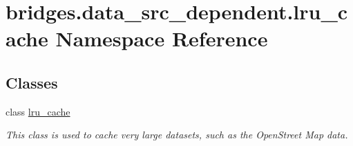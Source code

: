\hypertarget{namespacebridges_1_1data__src__dependent_1_1lru__cache}{}\section{bridges.\+data\+\_\+src\+\_\+dependent.\+lru\+\_\+cache Namespace Reference}
\label{namespacebridges_1_1data__src__dependent_1_1lru__cache}
\subsection*{Classes}
\begin{DoxyCompactItemize}
\item 
class \hyperlink{classbridges_1_1data__src__dependent_1_1lru__cache_1_1lru__cache}{lru\+\_\+cache}
\begin{DoxyCompactList}\small\item\em This class is used to cache very large datasets, such as the Open\+Street Map data. \end{DoxyCompactList}\end{DoxyCompactItemize}

